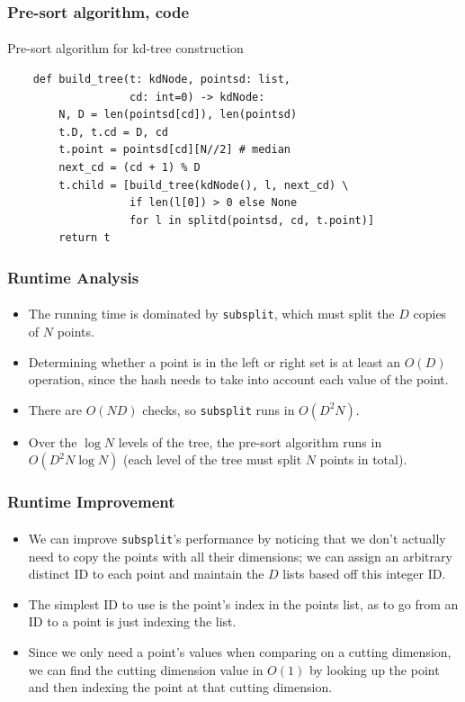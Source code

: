 \documentclass{beamer}                             %
\begin{document}
\begin{frame}[fragile]
\frametitle{Pre-sort algorithm, code}
\framesubtitle{}
\begin{algorithm}[H]
  \caption{Pre-sort algorithm for kd-tree construction}
  \begin{verbatim}
    def build_tree(t: kdNode, pointsd: list,
                   cd: int=0) -> kdNode:
        N, D = len(pointsd[cd]), len(pointsd)
        t.D, t.cd = D, cd
        t.point = pointsd[cd][N//2] # median
        next_cd = (cd + 1) % D
        t.child = [build_tree(kdNode(), l, next_cd) \
                   if len(l[0]) > 0 else None
                   for l in splitd(pointsd, cd, t.point)]
        return t
  \end{verbatim}
\end{algorithm}
\end{frame}

\begin{frame}
\frametitle{Runtime Analysis}
\framesubtitle{}
\begin{itemize}
  \item The running time is dominated by \texttt{subsplit},
    which must split the \( D \) copies of \( N \) points.
  \item Determining whether a point is in the left or
    right set is at least an \( O(D) \) operation, since the
    hash needs to take into account each value of the point.
  \item There are \( O(ND) \) checks, so
    \texttt{subsplit} runs in \( O(D^2 N) \).
  \item Over the \( \log N \) levels of the tree, the
    pre-sort algorithm runs in \( O(D^2 N \log N) \) (each
    level of the tree must split \( N \) points in total).
\end{itemize}
\end{frame}

\begin{frame}
\frametitle{Runtime Improvement}
\framesubtitle{}
\begin{itemize}
  \item We can improve \texttt{subsplit}'s performance by noticing that we
    don't actually need to copy the points with all their dimensions; we can
    assign an arbitrary distinct ID to each point and maintain the \( D \)
    lists based off this integer ID.
  \item The simplest ID to use is the point's index in the points
    list, as to go from an ID to a point is just indexing the list.
  \item Since we only need a point's values when comparing on a cutting
    dimension, we can find the cutting dimension value in \( O(1) \) by looking
    up the point and then indexing the point at that cutting dimension.
\end{itemize}
\end{frame}
\end{document}

